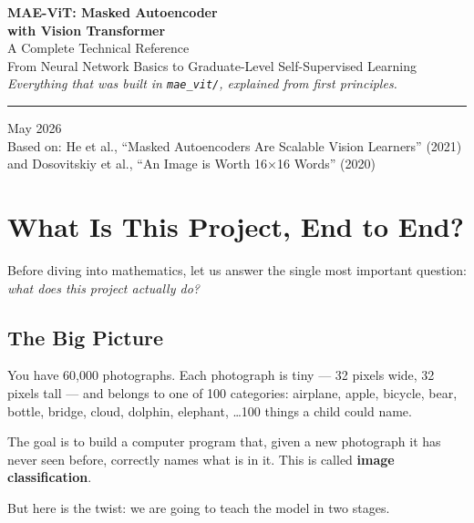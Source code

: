 \documentclass[12pt, a4paper]{report}
\begin{document}
\begin{titlepage}
\centering
\vspace*{3cm}
{\Huge\bfseries\color{deepblue} MAE-ViT: Masked Autoencoder\\[0.3em]
with Vision Transformer}\\[1cm]
{\Large\color{gray} A Complete Technical Reference}\\[0.5cm]
{\large From Neural Network Basics to Graduate-Level Self-Supervised Learning}\\[3cm]
{\large\textit{Everything that was built in \texttt{mae\_vit/}, explained from first principles.}}\\[2cm]
\hrule
\vspace{1cm}
{\large May 2026}\\[0.5cm]
{\normalsize Based on: He et al., ``Masked Autoencoders Are Scalable Vision Learners'' (2021)\\
and Dosovitskiy et al., ``An Image is Worth 16×16 Words'' (2020)}
\end{titlepage}

\tableofcontents
\clearpage

\chapter{What Is This Project, End to End?}

Before diving into mathematics, let us answer the single most important question: \emph{what does this project actually do?}

\section{The Big Picture}

You have 60,000 photographs. Each photograph is tiny — 32 pixels wide, 32 pixels tall — and belongs to one of 100 categories: airplane, apple, bicycle, bear, bottle, bridge, cloud, dolphin, elephant, \ldots 100 things a child could name.

The goal is to build a computer program that, given a new photograph it has never seen before, correctly names what is in it. This is called \textbf{image classification}.

But here is the twist: we are going to teach the model in two stages.
\end{document}
